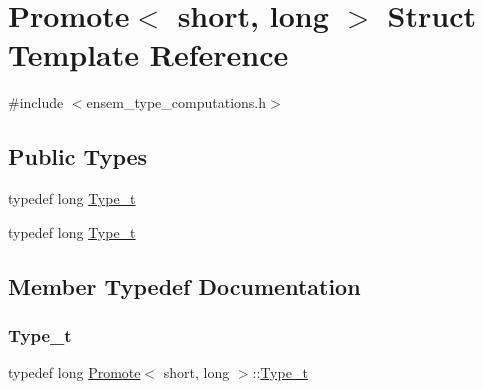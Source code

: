 \hypertarget{structPromote_3_01short_00_01long_01_4}{}\section{Promote$<$ short, long $>$ Struct Template Reference}
\label{structPromote_3_01short_00_01long_01_4}


{\ttfamily \#include $<$ensem\+\_\+type\+\_\+computations.\+h$>$}

\subsection*{Public Types}
\begin{DoxyCompactItemize}
\item 
typedef long \mbox{\hyperlink{structPromote_3_01short_00_01long_01_4_a46884a4f8850dbebc27c57717668957b}{Type\+\_\+t}}
\item 
typedef long \mbox{\hyperlink{structPromote_3_01short_00_01long_01_4_a46884a4f8850dbebc27c57717668957b}{Type\+\_\+t}}
\end{DoxyCompactItemize}


\subsection{Member Typedef Documentation}
\mbox{\label{structPromote_3_01short_00_01long_01_4_a46884a4f8850dbebc27c57717668957b}} 
\subsubsection{\texorpdfstring{Type\_t}{Type\_t}\hspace{0.1cm}{\footnotesize\ttfamily [1/2]}}
{\footnotesize\ttfamily typedef long \mbox{\hyperlink{structPromote}{Promote}}$<$ short, long $>$\+::\mbox{\hyperlink{structPromote_3_01short_00_01long_01_4_a46884a4f8850dbebc27c57717668957b}{Type\+\_\+t}}}

\mbox{\label{structPromote_3_01short_00_01long_01_4_a46884a4f8850dbebc27c57717668957b}} 
